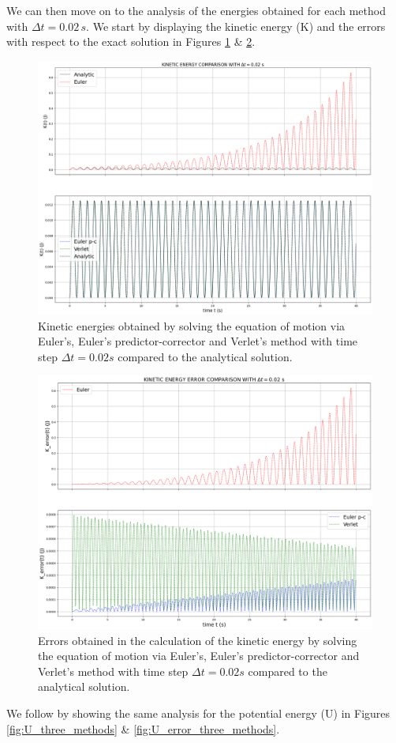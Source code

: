\documentclass{article}
\begin{document}
We can then move on to the analysis of the energies obtained for each method with $\Delta t=0.02 \,s$. We start by displaying the kinetic energy (K) and the errors with respect to the exact solution in Figures \ref{fig:K_three_methods} \& \ref{fig:K_error_three_methods}.
\begin{figure}[h!]
 \centering
  \includegraphics[width=0.7\linewidth]{K_eq_motion.png}
  \caption{Kinetic energies obtained by solving the equation of motion via Euler's, Euler's predictor-corrector and Verlet's method with time step $\Delta t=0.02 s$ compared to the analytical solution.}
  \label{fig:K_three_methods}
\end{figure}
\begin{figure}[h!]
 \centering
  \includegraphics[width=0.7\linewidth]{K_error_eq_motion.png}
  \caption{Errors obtained in the calculation of the kinetic energy by solving the equation of motion via Euler's, Euler's predictor-corrector and Verlet's method with time step $\Delta t=0.02 s$ compared to the analytical solution.}
  \label{fig:K_error_three_methods}
\end{figure}
We follow by showing the same analysis for the potential energy (U) in Figures \ref{fig:U_three_methods} \& \ref{fig:U_error_three_methods}.
\end{document}
